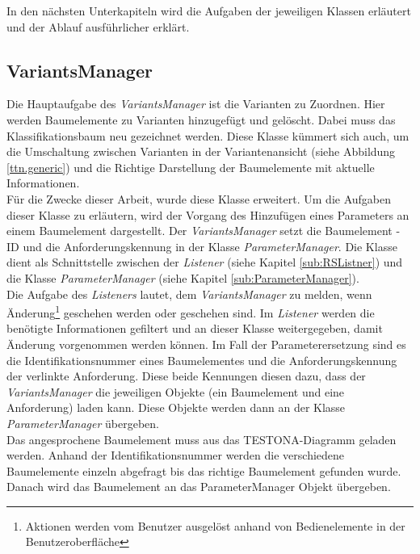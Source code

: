 In den nächsten Unterkapiteln wird die Aufgaben der jeweiligen Klassen erläutert und der Ablauf ausführlicher erklärt.


\subsection{VariantsManager}\label{sub.VariantsManager}
Die Hauptaufgabe des \textit{VariantsManager} ist die Varianten zu Zuordnen. Hier werden Baumelemente zu Varianten hinzugefügt und gelöscht. Dabei muss das Klassifikationsbaum neu gezeichnet werden. Diese Klasse kümmert sich auch, um die Umschaltung zwischen Varianten in der Variantenansicht (siehe Abbildung \ref{ttn.generic}) und die Richtige Darstellung der Baumelemente mit aktuelle Informationen.\\


Für die  Zwecke dieser Arbeit, wurde diese Klasse erweitert. Um die Aufgaben dieser Klasse zu erläutern, wird der Vorgang des Hinzufügen eines Parameters an einem Baumelement dargestellt. Der \textit{VariantsManager} setzt die Baumelement - ID und die Anforderungskennung in der Klasse \textit{ParameterManager}. Die Klasse dient als Schnittstelle zwischen der \textit{Listener} (siehe Kapitel \ref{sub:RSListner}) und die Klasse \textit{ParameterManager}  (siehe Kapitel \ref{sub:ParameterManager}).\\


Die Aufgabe des \textit{Listeners} lautet, dem \textit{VariantsManager} zu melden, wenn Änderung\footnote{Aktionen werden vom Benutzer ausgelöst anhand von Bedienelemente in der Benutzeroberfläche} geschehen werden oder geschehen sind. Im \textit{Listener} werden die benötigte Informationen gefiltert und an dieser Klasse weitergegeben, damit Änderung vorgenommen werden können. Im Fall der Parameterersetzung sind es die Identifikationsnummer eines Baumelementes und die Anforderungskennung der verlinkte Anforderung. Diese beide Kennungen diesen dazu, dass der \textit{VariantsManager} die jeweiligen Objekte (ein Baumelement und eine Anforderung) laden kann. Diese Objekte werden dann an der Klasse \textit{ParameterManager} übergeben.\\


Das angesprochene Baumelement muss aus das TESTONA-Diagramm geladen werden. Anhand der Identifikationsnummer werden die verschiedene Baumelemente einzeln abgefragt bis das richtige Baumelement gefunden wurde. Danach wird das Baumelement an das ParameterManager Objekt übergeben.\\


